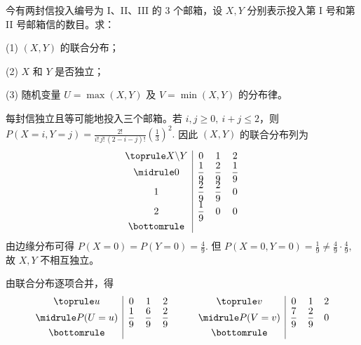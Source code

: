 \documentclass[lang=cn,11pt]{elegantbook}
\begin{document}
\begin{exercise}\label{exer:src-2017-201207-a-09-2credit}
今有两封信投入编号为 I、II、III 的 \(3\) 个邮箱，设 \(X,Y\) 分别表示投入第 I 号和第 II 号邮箱信的数目。求：\par
(1) \((X,Y)\) 的联合分布；\par
(2) \(X\) 和 \(Y\) 是否独立；\par
(3) 随机变量 \(U=\max(X,Y)\) 及 \(V=\min(X,Y)\) 的分布律。
\end{exercise}
\begin{solution}
每封信独立且等可能地投入三个邮箱。若 \(i,j\ge0,\ i+j\le2\)，则
\(
P(X=i,Y=j)=\frac{2!}{i!\,j!\,(2-i-j)!}
\left(\frac13\right)^2.
\)
因此 \((X,Y)\) 的联合分布列为
\[
\begin{array}{c|ccc}
\toprule
X\backslash Y & 0 & 1 & 2\\
\midrule
0 & \dfrac19 & \dfrac29 & \dfrac19\\
1 & \dfrac29 & \dfrac29 & 0\\
2 & \dfrac19 & 0 & 0\\
\bottomrule
\end{array}
\]
由边缘分布可得
\(
P(X=0)=P(Y=0)=\frac49.
\)
但
\(
P(X=0,Y=0)=\frac19\ne\frac49\cdot\frac49,
\)
故 \(X,Y\) 不相互独立。

由联合分布逐项合并，得
\[
\begin{array}{c|ccc}
\toprule
u & 0 & 1 & 2\\
\midrule
P(U=u) & \dfrac19 & \dfrac69 & \dfrac29\\
\bottomrule
\end{array}
\qquad
\begin{array}{c|ccc}
\toprule
v & 0 & 1 & 2\\
\midrule
P(V=v) & \dfrac79 & \dfrac29 & 0\\
\bottomrule
\end{array}
\]
\end{solution}
\end{document}

